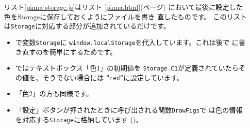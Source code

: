 リスト\ref{pinna-storage.js}はリスト
\ref{pinna.html}(\pageref{pinna.html}ページ)
において最後に設定した色をStorageに保存しておくように\JS ファイルを書き
直したものです。
このリストは\texttt{Storage}に対応する部分が追加されているだけです。
\begin{itemize}
 \item {}で変数\texttt{Storage}に
       \texttt{window.localStorage}を代入しています。これは後で
       に書き直すのを簡単にするためです。
 \item {}ではテキストボックス「色1」の初期値を
       \texttt{Storage.C1}が定義されていたらその値を、そうでない場合には
       \texttt{''red''}に設定しています。
 \item 「色2」の方も同様です。
 \item 「設定」ボタンが押されたときに呼び出される関数\texttt{DrawFigs}で
       は色の情報を対応する\texttt{Storage}に格納しています
       ()。
\end{itemize}